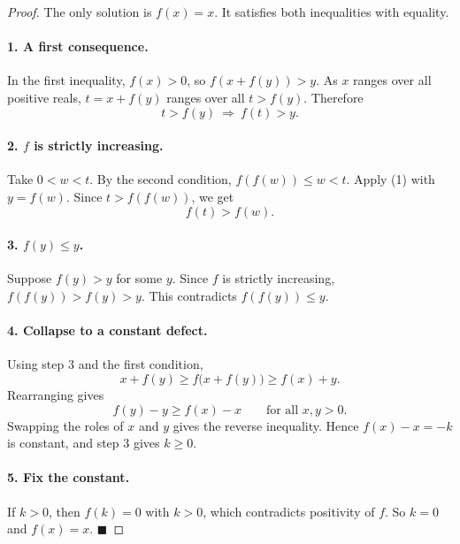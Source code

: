 
\begin{dlsummary}[title={\bfseries Solution 40. The Monotonicity Ratchet},breakable]

\begin{proof}
The only solution is \(f(x)=x\). It satisfies both inequalities with equality.

\paragraph{1. A first consequence.} In the first inequality, \(f(x)>0\), so \(f(x+f(y))>y\). As \(x\) ranges over all positive reals, \(t=x+f(y)\) ranges over all \(t>f(y)\). Therefore
\[
t>f(y)\ \Longrightarrow\ f(t)>y. \tag{1}
\]

\paragraph{2. \(f\) is strictly increasing.} Take \(0<w<t\). By the second condition, \(f(f(w))\le w<t\). Apply (1) with \(y=f(w)\). Since \(t>f(f(w))\), we get
\[
f(t)>f(w).
\]

\paragraph{3. \(f(y)\le y\).} Suppose \(f(y)>y\) for some \(y\). Since \(f\) is strictly increasing, \(f(f(y))>f(y)>y\). This contradicts \(f(f(y))\le y\).

\paragraph{4. Collapse to a constant defect.} Using step 3 and the first condition,
\[
x+f(y)\ge f\bigl(x+f(y)\bigr)\ge f(x)+y.
\]
Rearranging gives
\[
f(y)-y\ge f(x)-x\qquad\text{for all }x,y>0.
\]
Swapping the roles of \(x\) and \(y\) gives the reverse inequality. Hence \(f(x)-x=-k\) is constant, and step 3 gives \(k\ge0\).

\paragraph{5. Fix the constant.} If \(k>0\), then \(f(k)=0\) with \(k>0\), which contradicts positivity of \(f\). So \(k=0\) and \(f(x)=x\). \(\blacksquare\)
\end{proof}
\end{dlsummary}

